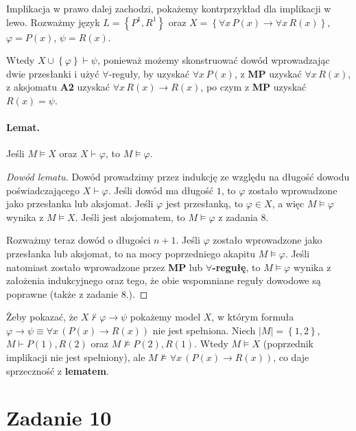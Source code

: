 Implikacja w prawo dalej zachodzi, pokażemy kontrprzykład dla implikacji w lewo. Rozważmy język \( L = \left\{ P^1, R^1 \right\} \) oraz \( X = \left\{ \forall x\,P(x) \to \forall x\,R(x) \right\} \), \( \varphi = P(x) \), \( \psi = R(x) \). 

Wtedy \( X \cup \left\{ \varphi \right\} \vdash \psi \), ponieważ możemy skonstruować dowód wprowadzając dwie przesłanki i użyć \( \forall \)-reguły, by uzyskać \( \forall x\, P(x) \), z \textbf{MP} uzyskać \( \forall x\,R(x) \), z aksjomatu \textbf{A2} uzyskać \( \forall x\,R(x) \to R(x) \), po czym z \textbf{MP} uzyskać \( R(x) = \psi \).

\paragraph{Lemat.} Jeśli \( M \models X \) oraz \( X \vdash \varphi \), to \( M \models \varphi \).

\begin{proof}[Dowód lematu]
    Dowód prowadzimy przez indukcję ze względu na długość dowodu poświadczającego \( X \vdash \varphi \). Jeśli dowód ma długość \( 1 \), to \( \varphi \) zostało wprowadzone jako przesłanka lub aksjomat. Jeśli \( \varphi \) jest przesłanką, to \( \varphi \in X \), a więc \( M \models \varphi \) wynika z \( M \models X \). Jeśli jest aksjomatem, to \( M \models \varphi \) z zadania 8.

    Rozważmy teraz dowód o długości \( n+1 \). Jeśli \( \varphi \) zostało wprowadzone jako przesłanka lub aksjomat, to na mocy poprzedniego akapitu \( M \models \varphi \). Jeśli natomiast zostało wprowadzone przez \textbf{MP} lub \textbf{\( \forall \)-regułę}, to \( M \models \varphi \) wynika z założenia indukcyjnego oraz tego, że obie wspomniane reguły dowodowe są poprawne (także z zadanie 8.).

\end{proof}

Żeby pokazać, że \( X \not\vdash \varphi \to \psi \) pokażemy model \( X \), w którym formuła \( \varphi \to \psi \equiv \forall x\, (P(x) \to R(x)) \) nie jest spełniona. Niech \( |M| = \left\{ 1, 2 \right\} \), \( M \vdash P(1), R(2) \) oraz \( M \not\models P(2), R(1)  \). Wtedy \( M \models X \) (poprzednik implikacji nie jest spełniony), ale \( M \not\models \forall x\, (P(x) \to R(x)) \), co daje sprzeczność z \textbf{lematem}.
 
\section*{Zadanie 10}

